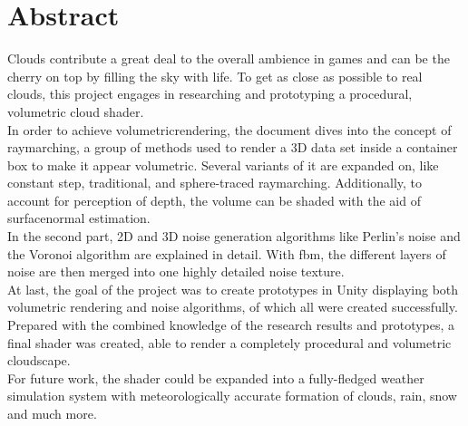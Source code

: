 \section*{Abstract}
Clouds contribute a great deal to the overall ambience in games and can be the cherry on top by filling the sky with life.
To get as close as possible to real clouds, this project engages in researching and prototyping a \gls{procedural}, volumetric cloud shader.
\\
In order to achieve \gls{volumetricrendering}, the document dives into the concept of \gls{raymarching}, a group of methods used to render a 3D data set inside a container box to make it appear volumetric.
Several variants of it are expanded on, like constant step, traditional, and sphere-traced \gls{raymarching}. Additionally, to account for perception of depth, the volume can be shaded with the aid of \gls{surfacenormal} estimation.
\\
In the second part, 2D and 3D \gls{noise} generation algorithms like Perlin's noise and the Voronoi algorithm are explained in detail. With \gls{fbm}, the different layers of noise are then merged into one highly detailed noise texture.
\\
At last, the goal of the project was to create prototypes in Unity displaying both volumetric rendering and noise algorithms, of which all were created successfully.
Prepared with the combined knowledge of the research results and prototypes, a final shader was created, able to render a completely \gls{procedural} and volumetric cloudscape.
\\
For future work, the shader could be expanded into a fully-fledged weather simulation system with meteorologically accurate formation of clouds, rain, snow and much more.